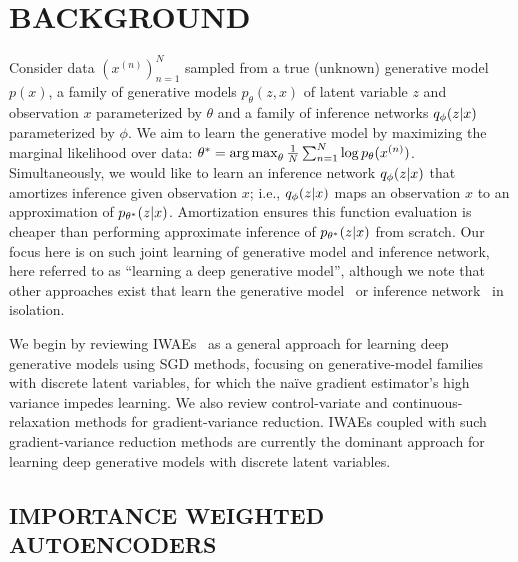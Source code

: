 
\section{BACKGROUND}
\vspace*{-1ex}
\label{sec:background}

Consider data $(x^{(n)})_{n = 1}^N$ sampled from a true (unknown) generative model $p(x)$, a family of generative models $p_\theta(z, x)$ of latent variable $z$ and observation $x$ parameterized by $\theta$ and a family of inference networks $q_\phi(z \lvert x)$ parameterized by $\phi$.
We aim to learn the generative model by maximizing the marginal likelihood over data: \(\theta^* = \operatorname*{arg\,max}_\theta  \frac{1}{N} \sum_{n = 1}^N  \log p_\theta(x^{(n)})\).
Simultaneously, we would like to learn an inference network $q_\phi(z \lvert x)$ that amortizes inference given observation $x$; i.e., $q_\phi(z \lvert x)$ maps an observation $x$ to an approximation of $p_{\theta^*}(z \lvert x)$.
Amortization ensures this function evaluation is cheaper than performing approximate inference of $p_{\theta^*}(z \lvert x)$ from scratch.
Our focus here is on such joint learning of generative model and inference network, here referred to as ``learning a deep generative model'', although we note that other approaches exist that learn the generative model~\citep{goodfellow2014generative,mohamed2016learning} or inference network~\citep{paige2016inference,le2017inference} in isolation.

We begin by reviewing \glspl{IWAE}~\citep{burda2016importance} as a general approach for learning deep generative models using \gls{SGD} methods, focusing on generative-model families with discrete latent variables, for which the na\"ive gradient estimator's high variance impedes learning.
We also review control-variate and continuous-relaxation methods for gradient-variance reduction.
\Glspl{IWAE} coupled with such gradient-variance reduction methods are currently the dominant approach for learning deep generative models with discrete latent variables.

\vspace*{-1ex}
\subsection{IMPORTANCE WEIGHTED AUTOENCODERS}
\vspace*{-1ex}

